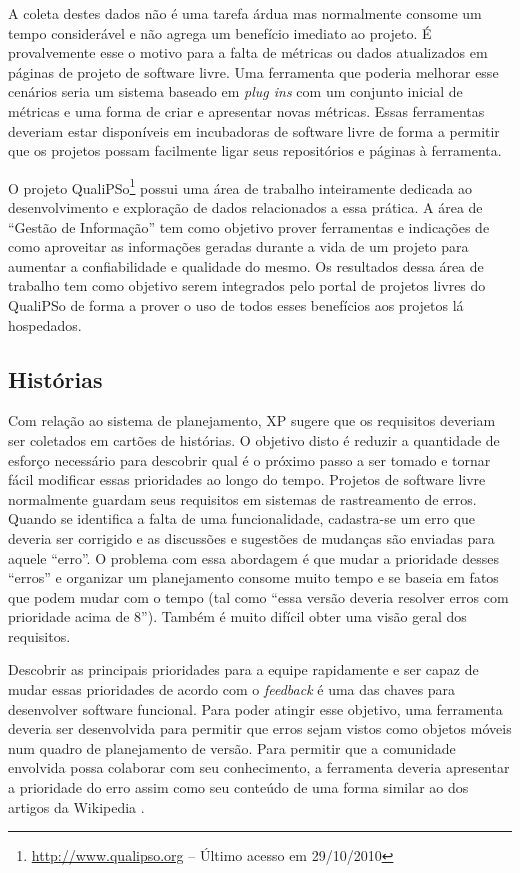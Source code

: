 A coleta destes dados não é uma tarefa árdua mas normalmente consome
um tempo considerável e não agrega um benefício imediato ao projeto. É
provalvemente esse o motivo para a falta de métricas ou dados
atualizados em páginas de projeto de software livre. Uma ferramenta
que poderia melhorar esse cenários seria um sistema baseado em
\emph{plug ins} com um conjunto inicial de métricas e uma forma de
criar e apresentar novas métricas. Essas ferramentas deveriam estar
disponíveis em incubadoras de software livre de forma a permitir que
os projetos possam facilmente ligar seus repositórios e páginas à
ferramenta.

O projeto QualiPSo\footnote{\url{http://www.qualipso.org} -- Último
  acesso em 29/10/2010} possui uma área de trabalho inteiramente
dedicada ao desenvolvimento e exploração de dados relacionados a essa
prática. A área de ``Gestão de Informação'' tem como objetivo prover
ferramentas e indicações de como aproveitar as informações geradas
durante a vida de um projeto para aumentar a confiabilidade e
qualidade do mesmo. Os resultados dessa área de trabalho tem como
objetivo serem integrados pelo portal de projetos livres do QualiPSo
de forma a prover o uso de todos esses benefícios aos projetos lá
hospedados.

\subsection{Histórias}
\label{subsec:stories}

Com relação ao sistema de planejamento, XP sugere que os requisitos
deveriam ser coletados em cartões de histórias. O objetivo disto é
reduzir a quantidade de esforço necessário para descobrir qual é o
próximo passo a ser tomado e tornar fácil modificar essas prioridades
ao longo do tempo. Projetos de software livre normalmente guardam seus
requisitos em sistemas de rastreamento de erros. Quando se identifica
a falta de uma funcionalidade, cadastra-se um erro que deveria ser
corrigido e as discussões e sugestões de mudanças são enviadas para
aquele ``erro''. O problema com essa abordagem é que mudar a
prioridade desses ``erros'' e organizar um planejamento consome muito
tempo e se baseia em fatos que podem mudar com o tempo (tal como
``essa versão deveria resolver erros com prioridade acima de
8''). Também é muito difícil obter uma visão geral dos requisitos.

Descobrir as principais prioridades para a equipe rapidamente e ser
capaz de mudar essas prioridades de acordo com o \emph{feedback} é uma
das chaves para desenvolver software funcional. Para poder atingir
esse objetivo, uma ferramenta deveria ser desenvolvida para permitir
que erros sejam vistos como objetos móveis num quadro de planejamento
de versão. Para permitir que a comunidade envolvida possa colaborar
com seu conhecimento, a ferramenta deveria apresentar a prioridade do
erro assim como seu conteúdo de uma forma similar ao dos artigos da
Wikipedia \cite{Surowiecki2004,Tapscott2006,Benkler2006}.

